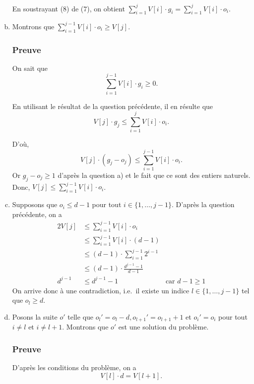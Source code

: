 \documentclass[12pt,a4paper]{article}
\begin{document}
\begin{enumerate}[a)]
 En soustrayant (8) de (7), on obtient \( \displaystyle\sum_{i=1}^{j} V[i]\cdot g_i = \displaystyle\sum_{i=1}^{j} V[i]\cdot o_i\).
 
 \item Montrons que \( \displaystyle\sum_{i=1}^{j-1} V[i]\cdot o_i \geq V[j]\).
 
 \subsubsection*{Preuve}
 On sait que 
 \begin{equation*}
    \displaystyle\sum_{i=1}^{j-1} V[i]\cdot g_i \geq 0.
 \end{equation*}

 En utilisant le r\'esultat de la question pr\'ec\'edente, il en r\'esulte que
 \begin{equation*}
    V[j]\cdot g_j \leq \displaystyle\sum_{i=1}^{j} V[i]\cdot o_i. 
 \end{equation*}
 
 D'o\`u, 
 \begin{equation*}
    V[j]\cdot (g_j - o_j) \leq \displaystyle\sum_{i=1}^{j-1} V[i]\cdot o_i. 
 \end{equation*}
 Or $g_j - o_j \geq 1$ d'apr\`es la question a) et le fait que ce sont des entiers naturels.
 Donc, \( V[j] \leq \displaystyle\sum_{i=1}^{j-1} V[i]\cdot o_i\).
 
 \item Supposons que $o_i \leq d-1$ pour tout $i \in \{1,\dotsc,j-1\}$. D'apr\`es la question pr\'ec\'edente, on a 
 \begin{alignat*}{2}
 	V[j] &\leq \displaystyle\sum_{i=1}^{j-1} V[i]\cdot o_i \\
 		 &\leq \displaystyle\sum_{i=1}^{j-1} V[i]\cdot (d-1) \\
 		 &\leq (d-1)\cdot \displaystyle\sum_{i=1}^{j-1} 2^{i-1} \\
 		 &\leq (d-1)\cdot \frac{d^{j-1}-1}{d-1} \\
 	d^{j-1}	 &\leq d^{j-1}-1 & \text{car } d-1 \geq 1
 \end{alignat*}
 On arrive donc \`a une contradiction, i.e.\ il existe un indice \(l \in \{1,\dotsc,j-1\}\) tel que $o_l \geq d$.
 
 \item Posons la suite $o'$ telle que $o_{l}' = o_l-d, o_{l+1}' = o_{l+1}+1$ et $o_i' = o_i$ pour tout $i \neq l$ et $i \neq l+1$. Montrons que $o'$ est une solution du probl\`eme.
 
 \subsubsection*{Preuve}
 D'apr\`es les conditions du probl\`eme, on a
 \begin{equation*}
    V[l]\cdot d = V[l+1].
 \end{equation*}
 

\end{enumerate}
\end{document}
